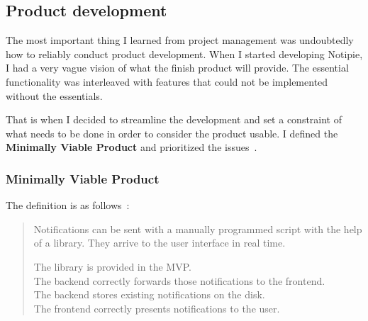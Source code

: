 \subsection{Product development}\label{sec:product-development}

The most important thing I learned from project management was undoubtedly
how to reliably conduct product development.
When I started developing Notipie,
I had a very vague vision of what the finish product will provide.
The essential functionality was interleaved with features
that could not be implemented without the essentials.

That is when I decided to streamline the development
and set a constraint of what needs to be done
in order to consider the product usable.
I defined the \textbf{Minimally Viable Product}
and prioritized the issues~\cite{sewera_issues_2022}.

\subsubsection{Minimally Viable Product}\label{sec:minimally-viable-product}

The definition is as follows~\cite{sewera_mvp_2022}:

\begin{quote}
      Notifications can be sent with a manually programmed script
      with the help of a library.
      They arrive to the user interface in real time.

      The library is provided in the MVP.\\
      The backend correctly forwards those notifications to the frontend.\\
      The backend stores existing notifications on the disk.\\
      The frontend correctly presents notifications to the user.
\end{quote}
